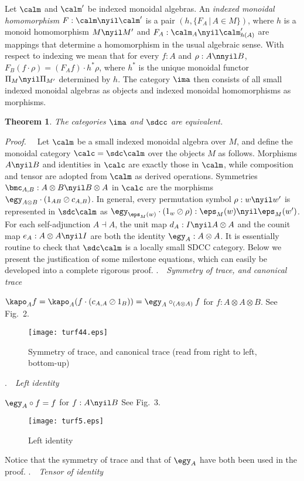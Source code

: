 \documentclass{eptcs}
\newtheorem{theorem}{Theorem}
\begin{document}
  Let $\calm $ and $\calm '$ be indexed monoidal algebras. An {\em indexed monoidal 
homomorphism\/} $F:\calm \nyil \calm '$ is a pair $(h, \{ F_A\,|\,A\in M\})$, where
$h$ is a monoid homomorphism $M\nyil M'$
and $F_A: \calm _A\nyil \calm '_{h(A)}$ are mappings
that determine a homomorphism in the usual algebraic sense. With respect to indexing
we mean that for every $f:A$ and $\rho :A\nnyil B$, $F_B(f\cdot \rho)=(F_A f)\cdot 
h^*\rho $, where $h^*$ is the unique monoidal functor $\Pi _M\nyil \Pi _{M'}$ determined
by $h$. The category $\ima $ then consists of all small indexed monoidal
algebras as objects and indexed monoidal homomorphisms as morphisms.
\begin{theorem}
The categories $\ima $ and $\sdcc $ are equivalent.
\end{theorem}
{\em Proof.\ \ }
Let $\calm $ be a small indexed monoidal algebra over $M$, and define the monoidal category
$\calc =\sdc \calm $ over the objects $M$ as follows.
Morphisms $A\nyil B$ and identities in $\calc $ are exactly those in $\calm $, while
composition and tensor are adopted from $\calm $ as derived operations.
Symmetries $\bmc _{A,B}: A\otimes B\nyil B\otimes A$ in $\calc $ are the morphisms 
$\egy _{A\otimes B}\cdot (1_{AB}\oslash c_{A,B})$.
In general, every permutation symbol $\rho :w\nyil w'$ is represented in $\sdc \calm $
as $\egy _{\eps _M(w)}\cdot (1_w\oslash \rho ):\eps _M(w)\nyil \eps _M(w')$. 
For each self-adjunction $A \dashv A$, the unit
map $d_A:I\nyil A\otimes A$ and the counit map $e_A:A\otimes A\nyil I$ are both the 
identity $\egy _A:A\otimes A$. It is essentially routine to check that $\sdc \calm $
is a locally small SDCC category. Below we present the justification of some milestone
equations, which can easily be developed into a complete rigorous proof.
.\ \ {\em Symmetry of trace, and canonical trace}
\vsp

    $\kapo _A f=\kapo _A (f\cdot (c_{A,A}\oslash 1_B))=
     \egy _A\circ _{(A\otimes A)}f$ for $f:A\otimes A\otimes B$.
\vspp\newline
See Fig.\ 2.
\begin{figure}[h]
\begin{center}
\texttt{[image: turf44.eps]}
\end{center}
\vspmini
\caption{Symmetry of trace, and canonical trace (read from right to left, bottom-up)}
\end{figure}
.\ \ {\em Left identity}
\vsp
 
     $\egy _A\circ f=f$ for $f:A\nyil B$
\vspp\newline
See Fig.\ 3.
\begin{figure}
\begin{center}
\texttt{[image: turf5.eps]}
\end{center}
\vspmini
\caption{Left identity}
\end{figure}
\newline
Notice that the symmetry of trace and that of $\egy _A$ have both been used in
the proof.
.\ \ {\em Tensor of identity}
\vsp
\end{document}
